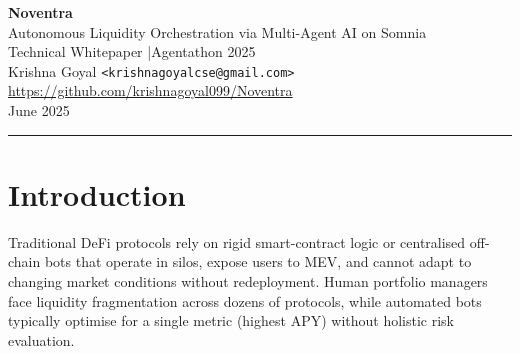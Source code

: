 \documentclass[11pt,a4paper]{article}
\begin{document}
\begin{center}
  {\LARGE\bfseries Noventra}\\[8pt]
  {\large Autonomous Liquidity Orchestration via Multi-Agent AI on Somnia}\\[10pt]
  {\normalsize Technical Whitepaper \quad|\quad Agentathon 2025}\\[6pt]
  {\small Krishna Goyal \quad \texttt{<krishnagoyalcse@gmail.com>}}\\[4pt]
  {\small \url{https://github.com/krishnagoyal099/Noventra}}\\[4pt]
  {\small June 2025}
\end{center}

\vspace{4pt}
\hrule
\vspace{12pt}

\begin{abstract}
Noventra is an autonomous liquidity orchestration protocol that deploys a swarm of five
specialised AI agents --- Scout, Risk, Strategy, Execution, and Coordinator --- on the Somnia
Testnet (EVM-compatible, Chain ID 50312). Each agent holds a separate funded wallet and
communicates exclusively through an immutable on-chain MessageBus. The agents collaborate to
identify DeFi yield opportunities, evaluate risk, propose allocation strategies via Groq LLM
reasoning, and execute intent-driven trades through a Flashbots SUAVE-inspired solver
architecture. All agent decisions, reasoning traces, and execution proofs are stored as
verifiable on-chain receipts, creating a fully auditable, autonomous DeFi portfolio manager
that requires no human intervention after deployment.
\end{abstract}

\tableofcontents
\newpage

\section{Introduction}

Traditional DeFi protocols rely on rigid smart-contract logic or centralised off-chain bots
that operate in silos, expose users to MEV, and cannot adapt to changing market conditions
without redeployment. Human portfolio managers face liquidity fragmentation across dozens of
protocols, while automated bots typically optimise for a single metric (highest APY) without
holistic risk evaluation.
\end{document}
